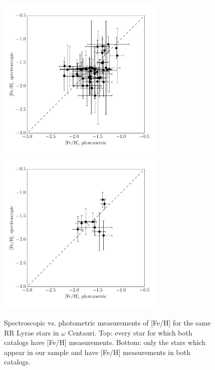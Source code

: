 \documentclass[a4paper,fleqn,usenatbib]{mnras}
\begin{document}
\begin{figure}
\begin{center}
\includegraphics[width=80mm]{final_plots/metallicity_comparison_all.pdf}
\includegraphics[width=80mm]{final_plots/metallicity_comparison_samestars.pdf}
\caption{Spectroscopic vs. photometric measurements of [Fe/H] for the same RR Lyrae stars in $\omega$ Centauri. Top: every star for which both catalogs have [Fe/H] measurements. Bottom: only the stars which appear in our sample and have [Fe/H] measurements in both catalogs.}
\label{fig:metallicity_comparison}
\end{center}
\end{figure}
\end{document}
